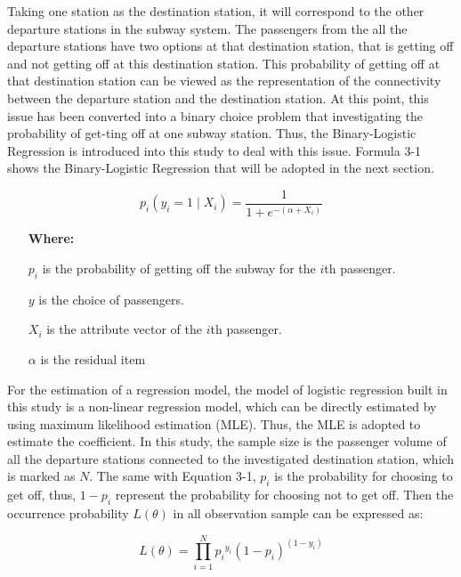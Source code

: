 \documentclass[utf8]{article}
\begin{document}
%
Taking one station as the destination station, it will correspond to the other departure stations in the subway system. The passengers from the all the departure stations have two options at that destination station, that is getting off and not getting off at this destination station. This probability of getting off at that destination station can be viewed as the representation of the connectivity between the departure station and the destination station. At this point, this issue has been converted into a binary choice problem that investigating the probability of get-ting off at one subway station. Thus, the Binary-Logistic Regression is introduced into this study to deal with this issue. Formula 3-1 shows the Binary-Logistic Regression that will be adopted in the next section.

\begin{equation}
	p_i(y_i=1 \mid X_i)=\frac{1}{1+e^{-(\alpha +X_i)}}
	\label{eq:LogisticRegression}
\end{equation}

\begin{enumerate}
	\item[\textbf{Where:}]
	\item[$p_i$] is the probability of getting off the subway for the $i$th passenger.
	\item[$y$] is the choice of passengers.
	\item[$X_i$] is the attribute vector of the $i$th passenger.
	\item[$\alpha$] is the residual item
\end{enumerate}

For the estimation of a regression model, the model of logistic regression built in this study is a non-linear regression model, which can be directly estimated by using maximum likelihood estimation (MLE). Thus, the MLE is adopted to estimate the coefficient. In this study, the sample size is the passenger volume of all the departure stations connected to the investigated destination station, which is marked as $N$. The same with Equation 3-1, $p_i$ is the probability for choosing to get off, thus, $1-p_i$ represent the probability for choosing not to get off. Then the occurrence probability $L(\theta)$ in all observation sample can be expressed as:

\begin{equation}
	L(\theta)=\prod_{i=1}^{N}{p_i}^{y_i}(1-p_i)^{(1-y_i)}
	\label{eq:MLE}
\end{equation}
\end{document}
